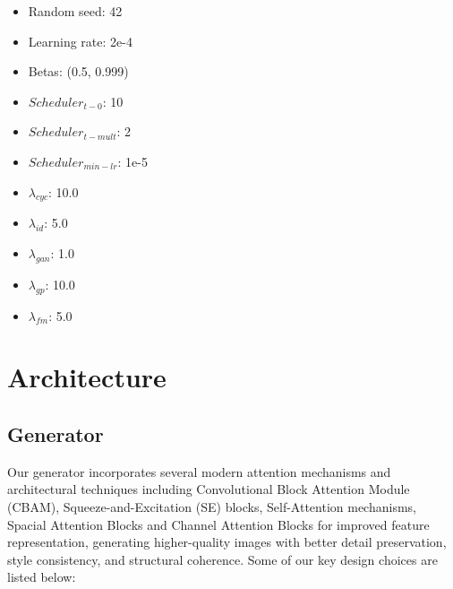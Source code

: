\documentclass[twoside,english,notitlepage]{report}
\begin{document}
\begin{multicols}{3}
    \begin{itemize}
        \item Random seed: 42
        \item Learning rate: 2e-4
        \item Betas: (0.5, 0.999)
        \item $Scheduler_{t-0}$: 10
        \item $Scheduler_{t-mult}$: 2
        \item $Scheduler_{min-lr}$: 1e-5
        \item $\lambda_{cyc}$: 10.0
        \item $\lambda_{id}$: 5.0
        \item $\lambda_{gan}$: 1.0
        \item $\lambda_{gp}$: 10.0
        \item $\lambda_{fm}$: 5.0
    \end{itemize}
\end{multicols}

\section{Architecture}

\subsection{Generator}\label{task1:generator}
Our generator incorporates several modern attention mechanisms and architectural techniques including Convolutional Block Attention Module (CBAM), Squeeze-and-Excitation (SE) blocks, Self-Attention mechanisms, Spacial Attention Blocks and Channel Attention Blocks for improved feature representation, generating higher-quality images with better detail preservation, style consistency, and structural coherence. Some of our key design choices are listed below:
\end{document}
